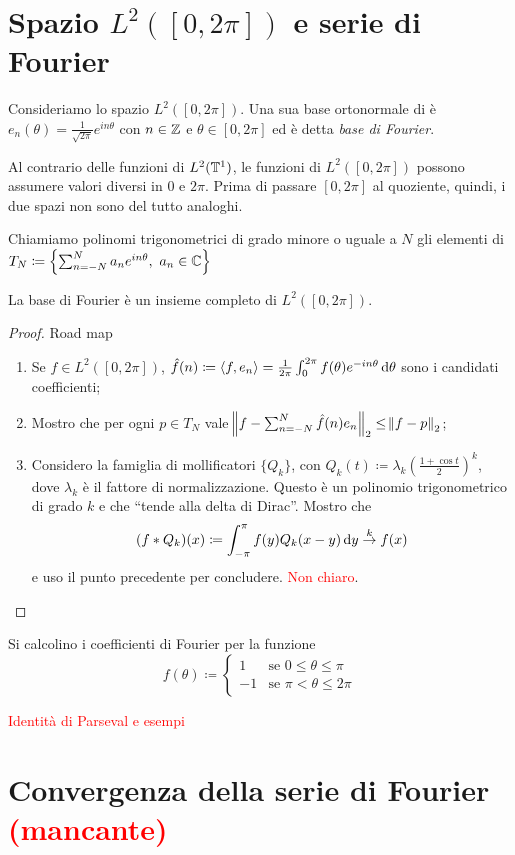 \section{Spazio $ L^2([0, 2\pi]) $ e serie di Fourier}
Consideriamo lo spazio $ L^2([0, 2\pi]) $.
Una sua base ortonormale di è $ e_n(\theta) = \frac{1}{\sqrt{2\pi}}e^{i n \theta} $ con $ n \in \mathbb{Z} $ e $ \theta \in [0, 2\pi] $ ed è detta \emph{base di Fourier}.

\begin{oss}
    Al contrario delle funzioni di $ L^2(\mathbb{T}^1) $, le funzioni di $ L^2([0, 2\pi]) $ possono assumere valori diversi in $ 0 $ e $ 2\pi $. Prima di passare $ [0,2\pi] $ al quoziente, quindi, i due spazi non sono del tutto analoghi.
\end{oss}

\begin{definition}
    Chiamiamo polinomi trigonometrici di grado minore o uguale a $ N $ gli elementi di
    $ T_N \coloneqq \left\{\sum_{n = -N}^{N} a_n e^{i n \theta}, \ a_n \in \mathbb{C}\right\} $
\end{definition}

\begin{thm}
    La base di Fourier è un insieme completo di $ L^2([0,2\pi]) $.
\end{thm}
\begin{proof}
    Road map
    \begin{enumerate}
        \item Se $ f \in L^2([0, 2\pi]) $, $ \hat{f}(n) \coloneqq {\langle f, e_n \rangle} = \frac{1}{2\pi} \int_{0}^{2\pi} f(\theta) e^{-i n\theta} \dif{\theta} $ sono i candidati coefficienti;
        \item Mostro che per ogni $ p \in T_N $ vale $ \norm{f - \sum_{n = -N}^{N} \hat{f}(n) e_n}_2 \leq \norm{f - p}_2 $;
        \item Considero la famiglia di mollificatori $ \{Q_k\} $, con $ Q_k(t) \coloneqq \lambda_k (\frac{1 + \cos{t}}{2})^k $, dove $ \lambda_k $ è il fattore di normalizzazione. Questo è un polinomio trigonometrico di grado $ k $ e che ``tende alla delta di Dirac''. Mostro che
        \[
        (f * Q_k)(x) \coloneqq \int_{-\pi}^{\pi} f(y) Q_k(x - y) \dif{y} \overset{k}{\to} f(x)
        \]
        e uso il punto precedente per concludere. \textcolor{red}{Non chiaro}.
    \end{enumerate}
\end{proof}

\begin{exercise}
    Si calcolino i coefficienti di Fourier per la funzione
    \[
    f(\theta) \coloneqq
    \begin{cases}
    1  & \text{se } 0 \leq \theta \leq \pi \\
    -1 & \text{se } \pi < \theta \leq 2\pi
    \end{cases}
    \]
\end{exercise}

\textcolor{red}{Identità di Parseval e esempi}

\section{Convergenza della serie di Fourier  \textcolor{red}{(mancante)}}
